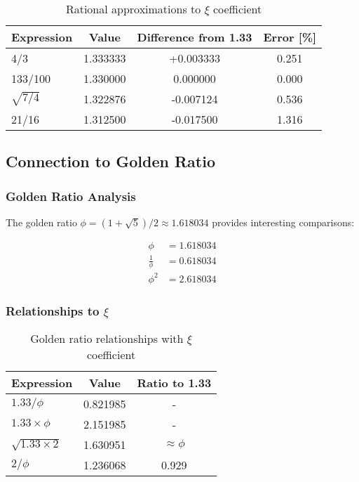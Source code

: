 \documentclass[12pt,a4paper]{article}
\newcommand{\myphi}{\ensuremath{\phi}}
\newcommand{\mytimes}{\ensuremath{\times}}
\newcommand{\myapprox}{\ensuremath{\approx}}
\begin{document}
	\begin{table}[htbp]
		\centering
		\begin{tabular}{lccc}
			\toprule
			\textbf{Expression} & \textbf{Value} & \textbf{Difference from 1.33} & \textbf{Error [\%]} \\
			\midrule
			4/3 & 1.333333 & +0.003333 & 0.251 \\
			133/100 & 1.330000 & 0.000000 & 0.000 \\
			$\sqrt{7/4}$ & 1.322876 & -0.007124 & 0.536 \\
			21/16 & 1.312500 & -0.017500 & 1.316 \\
			\bottomrule
		\end{tabular}
		\caption{Rational approximations to $\xi$ coefficient}
		\label{tab:rational_approximations}
	\end{table}
	
	\subsection{Connection to Golden Ratio}
	\label{subsec:golden_ratio}
	
	\subsubsection{Golden Ratio Analysis}
	\label{subsubsec:golden_ratio_analysis}
	
	The golden ratio $\myphi = (1 + \sqrt{5})/2 \myapprox 1.618034$ provides interesting comparisons:
	
	\begin{align}
		\myphi &= 1.618034 \\
		\frac{1}{\myphi} &= 0.618034 \\
		\myphi^2 &= 2.618034
	\end{align}
	
	\subsubsection{Relationships to $\xi$}
	\label{subsubsec:xi_golden_relationships}
	
	\begin{table}[htbp]
		\centering
		\begin{tabular}{lcc}
			\toprule
			\textbf{Expression} & \textbf{Value} & \textbf{Ratio to 1.33} \\
			\midrule
			$1.33/\myphi$ & 0.821985 & - \\
			$1.33 \mytimes \myphi$ & 2.151985 & - \\
			$\sqrt{1.33 \mytimes 2}$ & 1.630951 & $\myapprox \myphi$ \\
			$2/\myphi$ & 1.236068 & 0.929 \\
			\bottomrule
		\end{tabular}
		\caption{Golden ratio relationships with $\xi$ coefficient}
		\label{tab:golden_ratio_relationships}
	\end{table}
	
\end{document}
